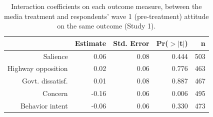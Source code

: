 \begin{table}[ht]
\centering
\caption{Interaction coefficients on each outcome measure, between the media
             treatment and respondents' wave 1 (pre-treatment) attitude on the same outcome (Study 1).} 
\label{tab:disruption_bywave1}
\begin{tabular}{rrrrr}
  \hline
 & Estimate & Std. Error & Pr($>$$|$t$|$) & n \\ 
  \hline
Salience & 0.06 & 0.08 & 0.444 & 503 \\ 
  Highway opposition & 0.02 & 0.06 & 0.776 & 463 \\ 
  Govt. dissatisf. & 0.01 & 0.08 & 0.887 & 467 \\ 
  Concern & -0.16 & 0.06 & 0.006 & 495 \\ 
  Behavior intent & -0.06 & 0.06 & 0.330 & 473 \\ 
   \hline
\end{tabular}
\end{table}
